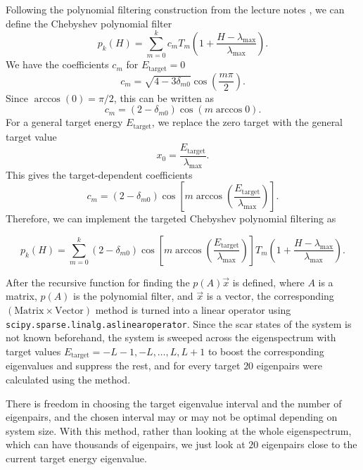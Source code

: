 \documentclass[%
 reprint,
 amsmath,amssymb,
 aps,
]{revtex4-2}
\begin{document}
Following the polynomial filtering construction from the lecture notes \cite{luitz2026physics767}, we can define the Chebyshev polynomial filter
\begin{equation}
    p_k(H) = \sum_{m=0}^{k} c_m T_m\left(1 + \frac{H - \lambda_{\max}}{\lambda_{\max}}\right).
\end{equation}
We have the coefficients $c_m$ for $E_\mathrm{target}=0$
\begin{equation}
    c_m = \sqrt{4-3\delta_{m0}} \cos\left(\frac{m\pi}{2}\right).
\end{equation}
Since $\arccos(0)=\pi/2$, this can be written as
\begin{equation}
    c_m = (2-\delta_{m0}) \cos\left(m\arccos 0\right).
\end{equation}
For a general target energy $E_\mathrm{target}$, we replace the zero target with the general target value
\begin{equation}
    x_0=\frac{E_\mathrm{target}}{\lambda_{\max}}.
\end{equation}
This gives the target-dependent coefficients
\begin{equation}
    c_m = (2-\delta_{m0}) \cos\left[m\arccos\left(\frac{E_\mathrm{target}}{\lambda_{\max}}\right)\right].
\end{equation}
Therefore, we can implement the targeted Chebyshev polynomial filtering as
\begin{widetext}
\begin{equation}
    p_k(H) = \sum_{m=0}^{k} (2-\delta_{m0}) \cos\left[m\arccos\left(\frac{E_\mathrm{target}}{\lambda_{\max}}\right)\right]T_m\left(1 + \frac{H - \lambda_{\max}}{\lambda_{\max}}\right).
\end{equation}
\end{widetext}

After the recursive function for finding the 
$p(A)\vec{x}$ is defined, where $A$ is a matrix, $p(A)$ is the polynomial filter, and $\vec{x}$ is a vector, the corresponding $(\mathrm{Matrix}\times\mathrm{Vector})$ method is turned into a linear operator using \texttt{scipy.sparse.linalg.aslinearoperator}. Since the scar states of the system is not known beforehand, the system is sweeped across the eigenspectrum with target values $E_\mathrm{target}=-L-1, -L,\dots,L,L+1$ to boost the corresponding eigenvalues and suppress the rest, and for every target $20$ eigenpairs were calculated using the method.

There is freedom in choosing the target eigenvalue interval and the number of eigenpairs, and the chosen interval may or may not be optimal depending on system size. With this method, rather than looking at the whole eigenspectrum, which can have thousands of eigenpairs, we just look at $20$ eigenpairs close to the current target energy eigenvalue. 
\end{document}
